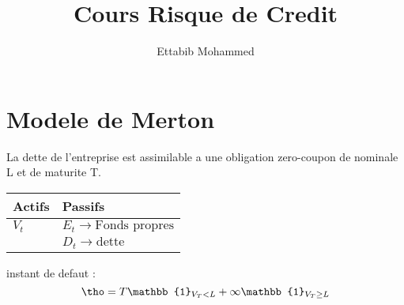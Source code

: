 \documentclass{Math}
\title{Cours Risque de Credit}
\author{Ettabib Mohammed}
\begin{document}
\maketitle
\section{Modele de Merton}
\label{sec:modele-de-merton}
La dette de l'entreprise est assimilable a une obligation zero-coupon de nominale L et de maturite T.
\begin{tabular}{t|l}

  Actifs & Passifs \\
\hline
  $V_t$ &  $E_t \longrightarrow \text{Fonds propres} $ \\
   & $D_t \longrightarrow \text{dette}$ \\
\end{tabular}

instant de defaut : 
\[
\tho = T \mathbb{1}_{V_T < L} + \infty \mathbb{1}_{V_T \geq L}
\]
\end{document}

